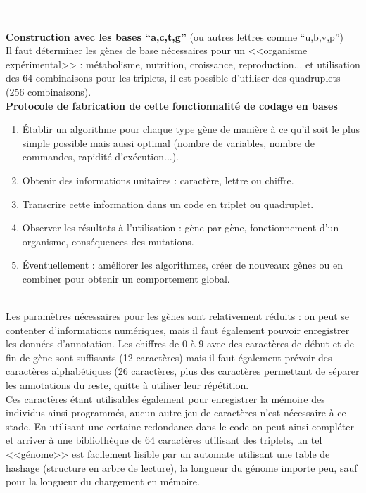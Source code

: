 \documentclass[11pt,twoside,a4paper]{article}
\begin{document}
\rule{10cm}{0.5mm}~\\

\textbf{Construction avec les bases ``a,c,t,g''} (ou autres lettres comme ``u,b,v,p'')~\\
Il faut d{\'e}terminer les g{\`e}nes de base n{\'e}cessaires pour un <<organisme exp{\'e}rimental>> : m{\'e}tabolisme, nutrition, croissance, reproduction... et utilisation des 64 combinaisons pour les triplets, il est possible d'utiliser des quadruplets (256 combinaisons).~\\

\textbf{Protocole de fabrication de cette fonctionnalit{\'e} de codage en bases}
\begin{enumerate}
	\item {\'E}tablir un algorithme pour chaque type g{\`e}ne de mani{\`e}re {\`a} ce qu'il soit le plus simple possible mais aussi optimal (nombre de variables, nombre de commandes, rapidit{\'e} d'ex{\'e}cution...). 
	\item Obtenir des informations unitaires : caract{\`e}re, lettre ou chiffre. 
	\item Transcrire cette information dans un code en triplet ou quadruplet. 
	\item Observer les r{\'e}sultats {\`a} l'utilisation : g{\`e}ne par g{\`e}ne, fonctionnement d'un organisme, cons{\'e}quences des mutations. %
	\item {\'E}ventuellement : am{\'e}liorer les algorithmes, cr{\'e}er de nouveaux g{\`e}nes ou en combiner pour obtenir un comportement global. 
\end{enumerate}~\\

Les param{\`e}tres n{\'e}cessaires pour les g{\`e}nes sont relativement r{\'e}duits : on peut se contenter d'informations num{\'e}riques, mais il faut {\'e}galement pouvoir enregistrer les donn{\'e}es d'annotation. Les chiffres de 0 {\`a} 9 avec des caract{\`e}res de d{\'e}but et de fin de g{\`e}ne sont suffisants (12 caract{\`e}res) mais il faut {\'e}galement pr{\'e}voir des caract{\`e}res alphab{\'e}tiques (26 caract{\`e}res, plus des caract{\`e}res permettant de s{\'e}parer les annotations du reste, quitte {\`a} utiliser leur r{\'e}p{\'e}tition.~\\

Ces caract{\`e}res {\'e}tant utilisables {\'e}galement pour enregistrer la m{\'e}moire des individus ainsi programm{\'e}s, aucun autre jeu de caract{\`e}res n'est n{\'e}cessaire {\`a} ce stade. En utilisant une certaine redondance dans le code on peut ainsi compl{\'e}ter et arriver {\`a} une biblioth{\`e}que de 64 caract{\`e}res utilisant des triplets, un tel <<g{\'e}nome>> est facilement lisible par un automate utilisant une table de hashage (structure en arbre de lecture), la longueur du g{\'e}nome importe peu, sauf pour la longueur du chargement en m{\'e}moire.~\\
\end{document}
